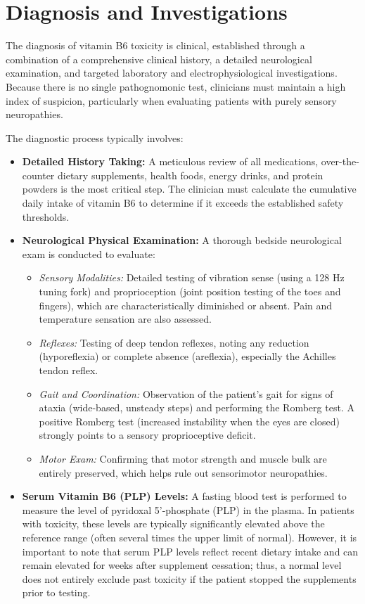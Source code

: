 \section*{Diagnosis and Investigations}
The diagnosis of vitamin B6 toxicity is clinical, established through a combination of a comprehensive clinical history, a detailed neurological examination, and targeted laboratory and electrophysiological investigations. Because there is no single pathognomonic test, clinicians must maintain a high index of suspicion, particularly when evaluating patients with purely sensory neuropathies.

The diagnostic process typically involves:
\begin{itemize}
    \item \textbf{Detailed History Taking:} A meticulous review of all medications, over-the-counter dietary supplements, health foods, energy drinks, and protein powders is the most critical step. The clinician must calculate the cumulative daily intake of vitamin B6 to determine if it exceeds the established safety thresholds.
    \item \textbf{Neurological Physical Examination:} A thorough bedside neurological exam is conducted to evaluate:
    \begin{itemize}
        \item \textit{Sensory Modalities:} Detailed testing of vibration sense (using a 128 Hz tuning fork) and proprioception (joint position testing of the toes and fingers), which are characteristically diminished or absent. Pain and temperature sensation are also assessed.
        \item \textit{Reflexes:} Testing of deep tendon reflexes, noting any reduction (hyporeflexia) or complete absence (areflexia), especially the Achilles tendon reflex.
        \item \textit{Gait and Coordination:} Observation of the patient's gait for signs of ataxia (wide-based, unsteady steps) and performing the Romberg test. A positive Romberg test (increased instability when the eyes are closed) strongly points to a sensory proprioceptive deficit.
        \item \textit{Motor Exam:} Confirming that motor strength and muscle bulk are entirely preserved, which helps rule out sensorimotor neuropathies.
    \end{itemize}
    \item \textbf{Serum Vitamin B6 (PLP) Levels:} A fasting blood test is performed to measure the level of pyridoxal 5'-phosphate (PLP) in the plasma. In patients with toxicity, these levels are typically significantly elevated above the reference range (often several times the upper limit of normal). However, it is important to note that serum PLP levels reflect recent dietary intake and can remain elevated for weeks after supplement cessation; thus, a normal level does not entirely exclude past toxicity if the patient stopped the supplements prior to testing.

\end{itemize}
